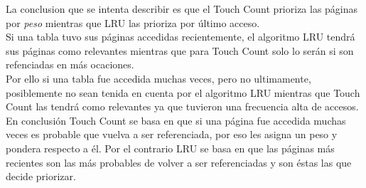 \documentclass[11pt, a4paper, spanish]{article}
\begin{document}
La conclusion que se intenta describir es que el Touch Count prioriza las p\'aginas por \textit{peso} mientras que LRU las prioriza por \'ultimo 
acceso.\\

Si una tabla tuvo sus p\'aginas accedidas recientemente, el algoritmo LRU tendr\'a sus p\'aginas como relevantes mientras que para Touch Count 
solo lo ser\'an si son refenciadas en m\'as ocaciones. \\

Por ello si una tabla fue accedida muchas veces, pero no ultimamente, 
posiblemente no sean tenida en cuenta por el algoritmo LRU mientras que Touch Count las tendrá como relevantes ya que tuvieron una frecuencia alta de
accesos. \\ 

En conclusi\'on Touch Count se basa en que si una p\'agina fue accedida muchas veces es probable que vuelva a ser referenciada, por eso les 
asigna un peso y pondera respecto a \'el. Por el contrario LRU se basa en que las p\'aginas m\'as recientes son las m\'as probables de volver a ser
referenciadas y son \'estas las que decide priorizar.
\end{document}
